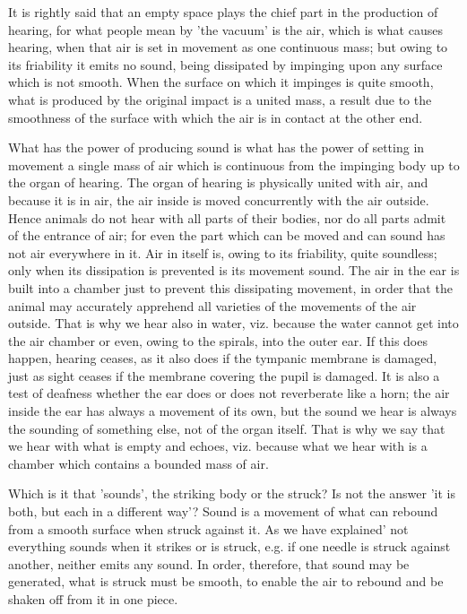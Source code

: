 It is rightly said that an empty space plays the chief part in the
production of hearing, for what people mean by 'the vacuum' is the
air, which is what causes hearing, when that air is set in movement
as one continuous mass; but owing to its friability it emits no sound,
being dissipated by impinging upon any surface which is not smooth.
When the surface on which it impinges is quite smooth, what is produced
by the original impact is a united mass, a result due to the smoothness
of the surface with which the air is in contact at the other end.

What has the power of producing sound is what has the power of setting
in movement a single mass of air which is continuous from the impinging
body up to the organ of hearing. The organ of hearing is physically
united with air, and because it is in air, the air inside is moved
concurrently with the air outside. Hence animals do not hear with
all parts of their bodies, nor do all parts admit of the entrance
of air; for even the part which can be moved and can sound has not
air everywhere in it. Air in itself is, owing to its friability, quite
soundless; only when its dissipation is prevented is its movement
sound. The air in the ear is built into a chamber just to prevent
this dissipating movement, in order that the animal may accurately
apprehend all varieties of the movements of the air outside. That
is why we hear also in water, viz. because the water cannot get into
the air chamber or even, owing to the spirals, into the outer ear.
If this does happen, hearing ceases, as it also does if the tympanic
membrane is damaged, just as sight ceases if the membrane covering
the pupil is damaged. It is also a test of deafness whether the ear
does or does not reverberate like a horn; the air inside the ear has
always a movement of its own, but the sound we hear is always the
sounding of something else, not of the organ itself. That is why we
say that we hear with what is empty and echoes, viz. because what
we hear with is a chamber which contains a bounded mass of air.

Which is it that 'sounds', the striking body or the struck? Is not
the answer 'it is both, but each in a different way'? Sound is a movement
of what can rebound from a smooth surface when struck against it.
As we have explained' not everything sounds when it strikes or is
struck, e.g. if one needle is struck against another, neither emits
any sound. In order, therefore, that sound may be generated, what
is struck must be smooth, to enable the air to rebound and be shaken
off from it in one piece. 

